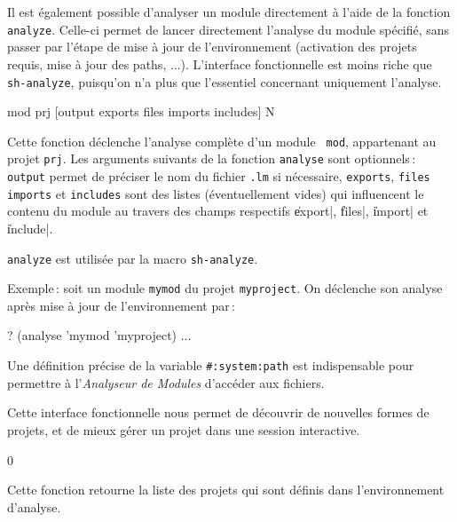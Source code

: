 Il est \'{e}galement possible d'analyser un module directement \`{a} l'aide de
la fonction {\tt analyze}. Celle-ci permet de lancer directement l'analyse
du module sp\'{e}cifi\'{e}, sans passer par l'\'{e}tape de mise \`{a} jour de
l'environnement (activation des projets requis, mise \`{a} jour des
paths, ...). L'interface fonctionnelle est moins riche que {\tt
sh-analyze}, puisqu'on n'a plus que l'essentiel concernant uniquement
l'analyse.

 {mod prj [output exports files imports includes]} {N}

Cette fonction d\'{e}clenche l'analyse compl\`{e}te d'un module {\tt
mod}, appartenant au projet {\tt prj}.
Les arguments suivants de la fonction {\tt analyse} sont optionnels\,:
{\tt output} permet
de pr\'{e}ciser le nom du fichier {\tt .lm} si n\'{e}cessaire,
{\tt exports}, {\tt files}
{\tt imports} et {\tt includes} sont des listes (\'{e}ventuellement
vides) qui influencent 
le contenu du module au travers des champs respectifs \|export|,
\|files|, \|import| et \|include|. 

\NoIndent
{\tt analyze} est utilis\'{e}e par la macro {\tt sh-analyze}.

Exemple\,: soit un module {\tt mymod} du projet {\tt myproject}.
On d\'{e}clenche son analyse
apr\`{e}s mise \`{a} jour de l'environnement par\,: 

\begin{Code*}
? (analyse 'mymod 'myproject)
 ...
\end{Code*}

Une d\'{e}finition pr\'{e}cise de la variable {\tt \#:system:path} est
indispensable pour permettre \`{a} l'{\em Analyseur de Modules}
d'acc\'{e}der aux fichiers.

Cette interface fonctionnelle nous
permet de d\'{e}couvrir de nouvelles formes de projets, et de mieux
g\'{e}rer un projet dans une session interactive.

 {}{0}

Cette fonction retourne la liste des projets qui sont d\'{e}finis dans
l'environnement d'analyse.

